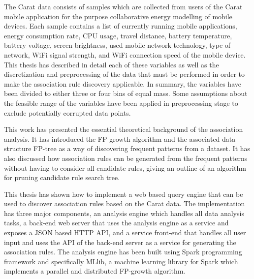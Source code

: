 The Carat data consists of samples which are collected from users of the Carat mobile application for the purpose collaborative energy modelling of mobile devices. Each sample contains a list of currently running mobile applications, energy consumption rate, CPU usage, travel distance, battery temperature, battery voltage, screen brightness, used mobile network technology, type of network,  WiFi signal strength, and WiFi connection speed of the mobile device. This thesis has described in detail each of these variables as well as the discretization and preprocessing of the data that must be performed in order to make the association rule discovery applicable. In summary, the variables have been divided to either three or four bins of equal mass. Some assumptions about the feasible range of the variables have been applied in preprocessing stage to exclude potentially corrupted data points.

This work has presented the essential theoretical background of the association analysis. It has introduced the FP-growth algorithm and the associated data structure FP-tree as a way of discovering frequent patterns from a dataset. It has also discussed how association rules can be generated from the frequent patterns without having to consider all candidate rules, giving an outline of an algorithm for pruning candidate rule search tree.

This thesis has shown how to implement a web based query engine that can be used to discover association rules based on the Carat data. The implementation has three major components, an analysis engine which handles all data analysis tasks, a back-end web server that uses the analysis engine as a service and exposes a JSON based HTTP API, and a service front-end that handles all user input and uses the API of the back-end server as a service for generating the association rules. The analysis engine has been built using Spark programming framework and specifically MLlib, a machine learning library for Spark which implements a parallel and distributed FP-growth algorithm.

